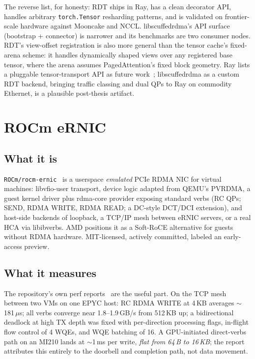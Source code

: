 \documentclass[11pt,letterpaper]{article}
\begin{document}
The reverse list, for honesty: RDT ships in Ray, has a clean decorator API, handles arbitrary \texttt{torch.Tensor} resharding patterns, and is validated on frontier-scale hardware against Mooncake and NCCL. libscuffedrdma's API surface (bootstrap + connector) is narrower and its benchmarks are two consumer nodes. RDT's view-offset registration is also more general than the tensor cache's fixed-arena scheme: it handles dynamically shaped views over any registered base tensor, where the arena assumes PagedAttention's fixed block geometry. Ray lists a pluggable tensor-transport API as future work~\cite{ray_rdt_custom}; libscuffedrdma as a custom RDT backend, bringing traffic classing and dual QPs to Ray on commodity Ethernet, is a plausible post-thesis artifact.

\section{ROCm eRNIC}

\subsection{What it is}

\texttt{ROCm/rocm-ernic}~\cite{rocm_ernic} is a userspace \emph{emulated} PCIe RDMA NIC for virtual machines: libvfio-user transport, device logic adapted from QEMU's PVRDMA, a guest kernel driver plus rdma-core provider exposing standard verbs (RC QPs; SEND, RDMA WRITE, RDMA READ; a DC-style DCT/DCI extension), and host-side backends of loopback, a TCP/IP mesh between eRNIC servers, or a real HCA via libibverbs. AMD positions it as a Soft-RoCE alternative for guests without RDMA hardware. MIT-licensed, actively committed, labeled an early-access preview.

\subsection{What it measures}

The repository's own perf reports~\cite{rocm_ernic_perf,rocm_ernic_gpu} are the useful part. On the TCP mesh between two VMs on one EPYC host: RC RDMA WRITE at 4\,KB averages $\sim$181\,$\mu$s; all verbs converge near 1.8--1.9\,GB/s from 512\,KB up; a bidirectional deadlock at high TX depth was fixed with per-direction processing flags, in-flight flow control of 4 WQEs, and WQE batching of 16. A GPU-initiated direct-verbs path on an MI210 lands at $\sim$1\,ms per write, \emph{flat from 64\,B to 16\,KB}; the report attributes this entirely to the doorbell and completion path, not data movement.
\end{document}
